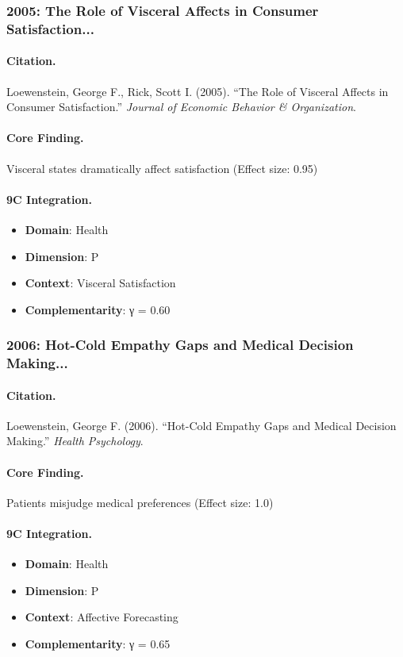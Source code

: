 \subsubsection{2005: The Role of Visceral Affects in Consumer Satisfaction...}

\paragraph{Citation.}
Loewenstein, George F., Rick, Scott I. (2005). ``The Role of Visceral Affects in Consumer Satisfaction.''
\textit{Journal of Economic Behavior & Organization}.

\paragraph{Core Finding.}
Visceral states dramatically affect satisfaction (Effect size: 0.95)

\paragraph{9C Integration.}
\begin{itemize}[nosep]
  \item \textbf{Domain}: Health
  \item \textbf{Dimension}: P
  \item \textbf{Context}: Visceral Satisfaction
  \item \textbf{Complementarity}: γ = 0.60
\end{itemize}

\subsubsection{2006: Hot-Cold Empathy Gaps and Medical Decision Making...}

\paragraph{Citation.}
Loewenstein, George F. (2006). ``Hot-Cold Empathy Gaps and Medical Decision Making.''
\textit{Health Psychology}.

\paragraph{Core Finding.}
Patients misjudge medical preferences (Effect size: 1.0)

\paragraph{9C Integration.}
\begin{itemize}[nosep]
  \item \textbf{Domain}: Health
  \item \textbf{Dimension}: P
  \item \textbf{Context}: Affective Forecasting
  \item \textbf{Complementarity}: γ = 0.65
\end{itemize}

